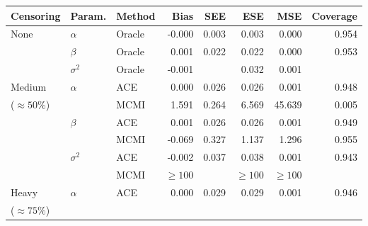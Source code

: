 \documentclass[12pt]{article}
\begin{document}
\begin{table}[!ht]
\centering
\begin{tabular}{lllrrrrr}
  \hline
Censoring & Param. & Method & Bias & SEE & ESE & MSE & Coverage \\ 
  \hline
   None & $\alpha$ & Oracle & -0.000 & 0.003 & 0.003 & 0.000 & 0.954 \\
   & $\beta$ & Oracle & 0.001 & 0.022 & 0.022 & 0.000 & 0.953 \\ 
   & $\sigma^2$ & Oracle & -0.001 &  & 0.032 & 0.001 &  \\ 
  Medium & $\alpha$ & ACE & 0.000 & 0.026 & 0.026 & 0.001 & 0.948 \\ 
  ($\approx 50\%$) %
   &  & MCMI & 1.591 & 0.264 & 6.569 & 45.639 & 0.005 \\
   & $\beta$ & ACE & 0.001 & 0.026 & 0.026 & 0.001 & 0.949 \\ 
   &  & MCMI & -0.069 & 0.327 & 1.137 & 1.296 & 0.955 \\
   & $\sigma^2$ & ACE & -0.002 & 0.037 & 0.038 & 0.001 & 0.943 \\ 
   &  & MCMI & $\geq 100$ &  & $\geq 100$ & $\geq 100$ &  \\
  Heavy & $\alpha$ & ACE & 0.000 & 0.029 & 0.029 & 0.001 & 0.946 \\ 
  ($\approx 75\%$) %

\end{tabular}
\end{table}
\end{document}
